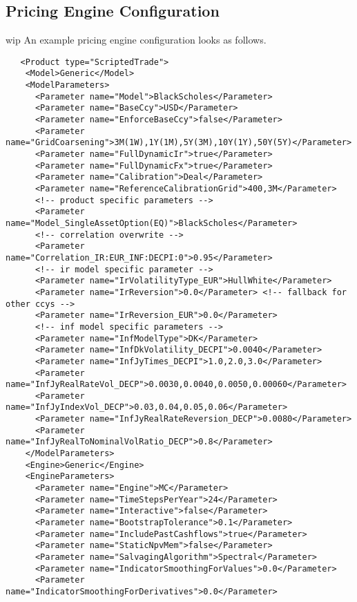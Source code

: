 \subsection{Pricing Engine Configuration}\label{pricingengine_config}

wip An example pricing engine configuration looks as follows.

\begin{verbatim}
   <Product type="ScriptedTrade">
    <Model>Generic</Model>
    <ModelParameters>
      <Parameter name="Model">BlackScholes</Parameter>
      <Parameter name="BaseCcy">USD</Parameter>
      <Parameter name="EnforceBaseCcy">false</Parameter>
      <Parameter name="GridCoarsening">3M(1W),1Y(1M),5Y(3M),10Y(1Y),50Y(5Y)</Parameter>
      <Parameter name="FullDynamicIr">true</Parameter>
      <Parameter name="FullDynamicFx">true</Parameter>
      <Parameter name="Calibration">Deal</Parameter>
      <Parameter name="ReferenceCalibrationGrid">400,3M</Parameter>
      <!-- product specific parameters -->
      <Parameter name="Model_SingleAssetOption(EQ)">BlackScholes</Parameter>
      <!-- correlation overwrite -->
      <Parameter name="Correlation_IR:EUR_INF:DECPI:0">0.95</Parameter>
      <!-- ir model specific parameter -->
      <Parameter name="IrVolatilityType_EUR">HullWhite</Parameter>
      <Parameter name="IrReversion">0.0</Parameter> <!-- fallback for other ccys -->
      <Parameter name="IrReversion_EUR">0.0</Parameter>
      <!-- inf model specific parameters -->
      <Parameter name="InfModelType">DK</Parameter>
      <Parameter name="InfDkVolatility_DECPI">0.0040</Parameter>
      <Parameter name="InfJyTimes_DECPI">1.0,2.0,3.0</Parameter>
      <Parameter name="InfJyRealRateVol_DECP">0.0030,0.0040,0.0050,0.00060</Parameter>
      <Parameter name="InfJyIndexVol_DECP">0.03,0.04,0.05,0.06</Parameter>
      <Parameter name="InfJyRealRateReversion_DECP">0.0080</Parameter>
      <Parameter name="InfJyRealToNominalVolRatio_DECP">0.8</Parameter>
    </ModelParameters>
    <Engine>Generic</Engine>
    <EngineParameters>
      <Parameter name="Engine">MC</Parameter>
      <Parameter name="TimeStepsPerYear">24</Parameter>
      <Parameter name="Interactive">false</Parameter>
      <Parameter name="BootstrapTolerance">0.1</Parameter>
      <Parameter name="IncludePastCashflows">true</Parameter>
      <Parameter name="StaticNpvMem">false</Parameter>
      <Parameter name="SalvagingAlgorithm">Spectral</Parameter>
      <Parameter name="IndicatorSmoothingForValues">0.0</Parameter>
      <Parameter name="IndicatorSmoothingForDerivatives">0.0</Parameter>

\end{verbatim}
